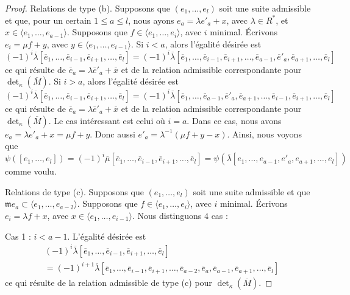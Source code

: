 \begin{proof}
\medskip\noindent
Relations de type (b). Supposons que $(e_1, \ldots, e_l)$ soit une
suite admissible et que, pour un certain $1 \leq a \leq l$, nous ayons
$e_a = \lambda e'_a + x$, avec $\lambda \in R^*$, et
$x \in \langle e_1, \ldots, e_{a - 1}\rangle$.
Supposons que $f \in \langle e_1, \ldots, e_i\rangle$, avec $i$ minimal.
Écrivons $e_i = \mu f + y$, avec $y \in \langle e_1, \ldots, e_{i - 1}\rangle$.
Si $i < a$, alors l'égalité désirée est
$$
(-1)^i
\overline{\lambda}
[\overline{e}_1,
\ldots,
\overline{e}_{i - 1},
\overline{e}_{i + 1},
\ldots,
\overline{e}_l]
=
(-1)^i
\overline{\lambda}
[\overline{e}_1,
\ldots,
\overline{e}_{i - 1},
\overline{e}_{i + 1},
\ldots,
\overline{e}_{a - 1},
\overline{e}'_a,
\overline{e}_{a + 1},
\ldots,
\overline{e}_l]
$$
ce qui résulte de $\overline{e}_a = \lambda \overline{e}'_a + \overline{x}$
et de la relation admissible correspondante pour $\det_\kappa(\overline{M})$.
Si $i > a$, alors l'égalité désirée est
$$
(-1)^i
\overline{\lambda}
[\overline{e}_1,
\ldots,
\overline{e}_{i - 1},
\overline{e}_{i + 1},
\ldots,
\overline{e}_l]
=
(-1)^i
\overline{\lambda}
[\overline{e}_1,
\ldots,
\overline{e}_{a - 1},
\overline{e}'_a,
\overline{e}_{a + 1},
\ldots,
\overline{e}_{i - 1},
\overline{e}_{i + 1},
\ldots,
\overline{e}_l]
$$
ce qui résulte de $\overline{e}_a = \lambda \overline{e}'_a + \overline{x}$
et de la relation admissible correspondante pour $\det_\kappa(\overline{M})$.
Le cas intéressant est celui où $i = a$. Dans ce cas, nous avons
$e_a = \lambda e'_a + x = \mu f + y$. Donc aussi
$e'_a = \lambda^{-1}(\mu f + y - x)$. Ainsi, nous voyons que
$$
\psi([e_1, \ldots, e_l])
= (-1)^i \overline{\mu}
[\overline{e}_1, \ldots,
\overline{e}_{i - 1},
\overline{e}_{i + 1}, \ldots, \overline{e}_l]
=
\psi(
\overline{\lambda}
[e_1, \ldots, e_{a - 1}, e'_a, e_{a + 1}, \ldots, e_l]
)
$$
comme voulu.

\medskip\noindent
Relations de type (c). Supposons que $(e_1, \ldots, e_l)$
soit une suite admissible et que
$\mathfrak m e_a \subset \langle e_1, \ldots, e_{a - 2}\rangle$.
Supposons que $f \in \langle e_1, \ldots, e_i\rangle$, avec $i$ minimal.
Écrivons $e_i = \lambda f + x$, avec $x \in \langle e_1, \ldots, e_{i - 1}\rangle$.
Nous distinguons $4$ cas :

\medskip\noindent
Cas 1 : $i < a - 1$. L'égalité désirée est
\begin{align*}
& (-1)^i
\overline{\lambda}
[\overline{e}_1,
\ldots,
\overline{e}_{i - 1},
\overline{e}_{i + 1},
\ldots,
\overline{e}_l] \\
& =
(-1)^{i + 1}
\overline{\lambda}
[\overline{e}_1,
\ldots,
\overline{e}_{i - 1},
\overline{e}_{i + 1},
\ldots,
\overline{e}_{a - 2},
\overline{e}_a,
\overline{e}_{a - 1},
\overline{e}_{a + 1},
\ldots,
\overline{e}_l]
\end{align*}
ce qui résulte de la relation admissible de type (c) pour
$\det_\kappa(\overline{M})$.


\end{proof}
